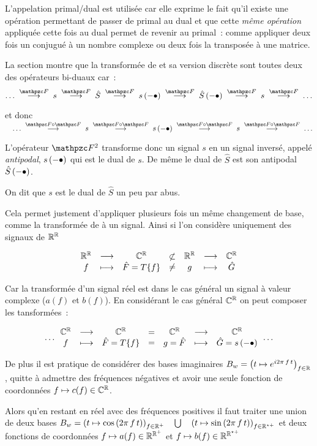 L'appelation primal/dual est utilisée car elle exprime le fait qu'il
existe une opération permettant de passer de primal au dual et que
cette \emph{même opération} appliquée cette fois au dual permet de
revenir au primal~: comme appliquer deux fois un conjugué à un nombre
complexe ou deux fois la transposée à une matrice.

La section  montre que la transformée de
\Fourier{} et sa version discrète sont toutes deux des opérateurs
bi-duaux car~:
$$\ldots \;\toOp{\F}\; s \;\toOp{\F}\; \hat{S} \;\toOp{\F}\; s\p{-\bullet} \;\toOp{\F}\; \hat{S}\p{-\bullet} \;\toOp{\F}\; s \;\toOp{\F}\; \ldots $$

et donc
$\quad\ldots \;\toOp{\F\circ\F}\; s \;\toOp{\F\circ\F}\; s\p{-\bullet}
\;\toOp{\F\circ\F}\; s \;\toOp{\F\circ\F}\; \ldots$

L'opérateur $\F^2$ transforme donc un signal $s$ en un signal inversé,
appelé \emph{antipodal}, $s\left(-\bullet\right)$ qui est le dual de $s$. De
même le dual de $\hat{S}$ est son antipodal $\hat{S}\left(-\bullet\right)$.

On dit que $s$ est le dual de $\hat{S}$ un peu par abus.

\begin{remarque}
  Cela permet justement d'appliquer plusieurs fois un même changement
  de base, comme la transformée de \Fourier{} à un signal. Ainsi si
  l'on considère uniquement des signaux de $\mathbb{R}^{\mathbb{R}}$

  $$ \begin{array}{ccc} \mathbb{R}^{\mathbb{R}} & \longrightarrow & \mathbb{C}^{\mathbb{R}} \\ f & \longmapsto & \hat{F}=T\{f\} \\ \end{array} \begin{array}{c} {\not\subset} \\ {\neq} \end{array} \begin{array}{ccc} \mathbb{R}^{\mathbb{R}} & \longrightarrow & \mathbb{C}^{\mathbb{R}} \\ g & \longmapsto & \hat{G} \\ \end{array}$$

  Car la transformée d'un signal réel est dans le cas général un
  signal à valeur complexe ($a(f)$ et $b(f)$). En considérant le cas
  général $\mathbb{C}^{\mathbb{R}}$ on peut composer les tansformées~:

  $$ \ldots\begin{array}{ccc} \mathbb{C}^{\mathbb{R}} & \longrightarrow & \mathbb{C}^{\mathbb{R}} \\ f & \longmapsto & \hat{F}=T\{f\} \\ \end{array} \begin{array}{c} {=} \\ {=} \end{array} \begin{array}{ccc} \mathbb{C}^{\mathbb{R}} & \longrightarrow & \mathbb{C}^{\mathbb{R}} \\ g=\hat{F} & \longmapsto & \hat{G}=s\left(-\bullet\right) \\ \end{array} \ldots$$

  De plus il est pratique de considérer des bases imaginaires
  $B_w=\left(t\mapsto e^{i2\pi\,f\,t}\right)_{f\in\mathbb{R}}$, quitte à
  admettre des fréquences négatives et avoir une seule fonction de
  coordonnées $f\mapsto c(f)\in\mathbb{C}^{\mathbb{R}}$.

  Alors qu'en restant en réel avec des fréquences positives il faut
  traiter une union de deux bases
  $B_w = \left(t\mapsto \cos\left(2\pi\,f\,t\right)\right)_{f\in\mathbb{R}^+} \quad
  \bigcup \quad \left(t\mapsto
    \sin\left(2\pi\,f\,t\right)\right)_{f\in\mathbb{R}^{\star +}}$ et deux fonctions de
  coordonnées $f\mapsto a(f)\in\mathbb{R}^{\mathbb{R}^+}$ et
  $f\mapsto b(f)\in\mathbb{R}^{\mathbb{R}^{\star +}}$

\end{remarque}
  



